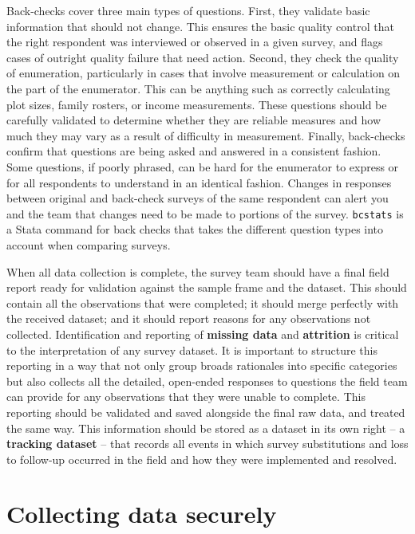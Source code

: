 Back-checks cover three main types of questions.
First, they validate basic information that should not change.
This ensures the basic quality control that the right respondent
was interviewed or observed in a given survey,
and flags cases of outright quality failure that need action.
Second, they check the quality of enumeration,
particularly in cases that involve measurement or calculation
on the part of the enumerator.
This can be anything such as correctly calculating plot sizes,
family rosters, or income measurements.
These questions should be carefully validated
to determine whether they are reliable measures
and how much they may vary as a result of difficulty in measurement.
Finally, back-checks confirm that questions are being asked and answered
in a consistent fashion. Some questions, if poorly phrased,
can be hard for the enumerator to express or for all respondents
to understand in an identical fashion.
Changes in responses between original and back-check surveys
of the same respondent
can alert you and the team that changes need to be made
to portions of the survey.
\texttt{bcstats} is a Stata command for back checks
that takes the different question types into account when comparing surveys.

When all data collection is complete,
the survey team should have a final field report
ready for validation against the sample frame and the dataset.
This should contain all the observations that were completed;
it should merge perfectly with the received dataset;
and it should report reasons for any observations not collected.
Identification and reporting of \textbf{missing data} and \textbf{attrition} is critical
to the interpretation of any survey dataset.
It is important to structure this reporting in a way that
not only group broads rationales into specific categories
but also collects all the detailed, open-ended responses to questions the field team can provide
for any observations that they were unable to complete.
This reporting should be validated and saved
alongside the final raw data, and treated the same way.
This information should be stored as a dataset in its own right
-- a \textbf{tracking dataset} --
that records all events in which survey substitutions
and loss to follow-up occurred in the field
and how they were implemented and resolved.


\section{Collecting data securely}

